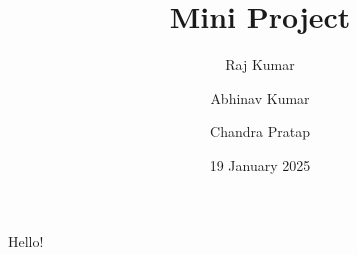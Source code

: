 \documentclass{report}
\title{Mini Project}
\date{19 January 2025}
\author{
	Raj Kumar
	\and
	Abhinav Kumar
	\and
	Chandra Pratap
}
\begin{document}
	\maketitle
	Hello!
\end{document}
